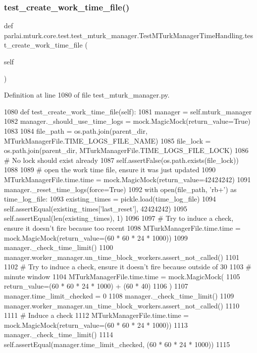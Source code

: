 \subsubsection{\texorpdfstring{test\+\_\+create\+\_\+work\+\_\+time\+\_\+file()}{test\_create\_work\_time\_file()}}
{\footnotesize\ttfamily def parlai.\+mturk.\+core.\+test.\+test\+\_\+mturk\+\_\+manager.\+Test\+M\+Turk\+Manager\+Time\+Handling.\+test\+\_\+create\+\_\+work\+\_\+time\+\_\+file (\begin{DoxyParamCaption}\item[{}]{self }\end{DoxyParamCaption})}



Definition at line 1080 of file test\+\_\+mturk\+\_\+manager.\+py.


\begin{DoxyCode}
1080     \textcolor{keyword}{def }test\_create\_work\_time\_file(self):
1081         manager = self.mturk\_manager
1082         manager.\_should\_use\_time\_logs = mock.MagicMock(return\_value=\textcolor{keyword}{True})
1083 
1084         file\_path = os.path.join(parent\_dir, MTurkManagerFile.TIME\_LOGS\_FILE\_NAME)
1085         file\_lock = os.path.join(parent\_dir, MTurkManagerFile.TIME\_LOGS\_FILE\_LOCK)
1086         \textcolor{comment}{# No lock should exist already}
1087         self.assertFalse(os.path.exists(file\_lock))
1088 
1089         \textcolor{comment}{# open the work time file, ensure it was just updated}
1090         MTurkManagerFile.time.time = mock.MagicMock(return\_value=42424242)
1091         manager.\_reset\_time\_logs(force=\textcolor{keyword}{True})
1092         with open(file\_path, \textcolor{stringliteral}{'rb+'}) \textcolor{keyword}{as} time\_log\_file:
1093             existing\_times = pickle.load(time\_log\_file)
1094             self.assertEqual(existing\_times[\textcolor{stringliteral}{'last\_reset'}], 42424242)
1095             self.assertEqual(len(existing\_times), 1)
1096 
1097         \textcolor{comment}{# Try to induce a check, ensure it doesn't fire because too recent}
1098         MTurkManagerFile.time.time = mock.MagicMock(return\_value=(60 * 60 * 24 * 1000))
1099         manager.\_check\_time\_limit()
1100         manager.worker\_manager.un\_time\_block\_workers.assert\_not\_called()
1101 
1102         \textcolor{comment}{# Try to induce a check, ensure it doesn't fire because outside of 30}
1103         \textcolor{comment}{# minute window}
1104         MTurkManagerFile.time.time = mock.MagicMock(
1105             return\_value=(60 * 60 * 24 * 1000) + (60 * 40)
1106         )
1107         manager.time\_limit\_checked = 0
1108         manager.\_check\_time\_limit()
1109         manager.worker\_manager.un\_time\_block\_workers.assert\_not\_called()
1110 
1111         \textcolor{comment}{# Induce a check}
1112         MTurkManagerFile.time.time = mock.MagicMock(return\_value=(60 * 60 * 24 * 1000))
1113         manager.\_check\_time\_limit()
1114         self.assertEqual(manager.time\_limit\_checked, (60 * 60 * 24 * 1000))
1115 
\end{DoxyCode}


